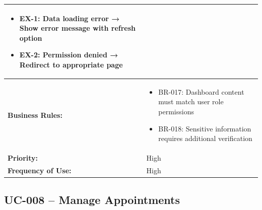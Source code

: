 \documentclass[12pt,a4paper]{article}
\begin{document}
\begin{longtable}{|p{4.5cm}|p{10.5cm}|}
\begin{itemize}
  \item EX-1: Data loading error → Show error message with refresh option
  \item EX-2: Permission denied → Redirect to appropriate page
\end{itemize} \\
\hline
\textbf{Business Rules:} &
\begin{itemize}
  \item BR-017: Dashboard content must match user role permissions
  \item BR-018: Sensitive information requires additional verification
\end{itemize} \\
\hline
\textbf{Priority:} & High \\
\hline
\textbf{Frequency of Use:} & High \\
\hline
\end{longtable}

\subsection{UC-008 – Manage Appointments}
\end{document}
